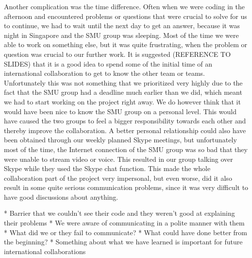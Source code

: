 Another complication was the time difference. Often when we were coding in the afternoon and encountered problems or questions that were crucial to solve for us to continue,
we had to wait until the next day to get an answer, because it was night in Singapore and the SMU group was sleeping. Most of the time we were able to work on something else,
but it was quite frustrating, when the problem or question was crucial to our further work.
It is suggested (REFERENCE TO SLIDES) that it is a good idea to spend some of the initial time of an international collaboration to get to know the other team or teams.
Unfortunately this was not something that we prioritized very highly due to the fact that the SMU group had a deadline much earlier than we did, which meant we had to start
working on the project right away. We do however think that it would have been nice to know the SMU group on a personal level. This would have caused the two groups to feel
a bigger responsibility towards each other and thereby improve the collaboration. A better personal relationship could also have been obtained through our weekly planned
Skype meetings, but unfortunately most of the time, the Internet connection of the SMU group was so bad that they were unable to stream video or voice. This resulted in 
our group talking over Skype while they used the Skype chat function. This made the whole collaboration part of the project very impersonal, but even worse, did it also
result in some quite serious communication problems, since it was very difficult to have good discussions about anything.


* Barrier that we couldn't see their code and they weren't good at explaining their problems
* We were aware of communicating in a polite manner with them
* What did we or they fail to communicate?
* What could have done better from the beginning?
* Something about what we have learned is important for future international collaborations

